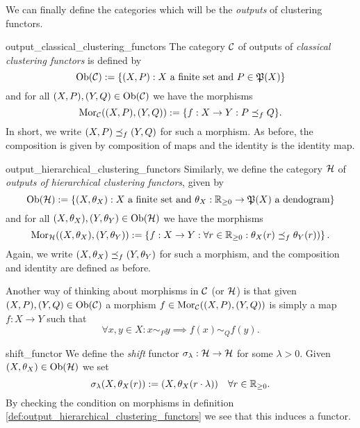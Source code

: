 We can finally define the categories which will be the \emph{outputs} of clustering functors.

\begin{definition}{\cite[Def.~3.2]{Carlsson2010}}{output_classical_clustering_functors}
The category $\mathcal{C}$ of outputs of \emph{classical clustering functors} is defined by
\begin{equation*}
    \mathrm {Ob}(\mathcal{C}) := \{(X, P): X \text{ a finite set and } P \in \mathfrak{P}(X)\}
\end{equation*}
and for all $(X,P), (Y,Q) \in \mathrm {Ob}(\mathcal{C})$ we have the morphisms
\begin{equation*}
    \mathrm {Mor}_{\mathcal{C}}((X,P), (Y,Q)) := \{f: X \to Y: P \preceq_f Q\}.
\end{equation*}
In short, we write $(X,P) \preceq_f (Y,Q)$ for such a morphism. As before, the composition is given by composition of maps and the identity is the identity map.
\end{definition}

\begin{definition}{\cite[Def.~3.3]{Carlsson2010}}{output_hierarchical_clustering_functors}
Similarly, we define the category $\mathcal{H}$ of \emph{outputs of hierarchical clustering functors}, given by
\begin{equation*}
    \mathrm {Ob}(\mathcal{H}) := \{(X, \theta_X): X \text{ a finite set and } \theta_X: \mathbb R_{\geq0} \to \mathfrak{P}(X) \ \text{a dendogram}\}
\end{equation*}
and for all $(X, \theta_X), (Y, \theta_Y) \in \mathrm {Ob}(\mathcal{H})$ we have the morphisms
\begin{equation*}
    \mathrm {Mor}_{\mathcal{H}}((X, \theta_X), (Y,\theta_Y)) :=
    \left\{f: X \to Y: \forall r \in \mathbb R_{\geq0}: \theta_X(r) \preceq_f \theta_Y(r)) \right\}.
\end{equation*}
Again, we write $(X, \theta_X) \preceq_f (Y, \theta_Y)$ for such a morphism, and the composition and identity are defined as before.
\end{definition}

Another way of thinking about morphisms in $\mathcal{C}$ (or $\mathcal{H}$) is that given $(X,P), (Y,Q) \in \mathrm {Ob}(\mathcal{C})$ a morphism $f \in \mathrm {Mor}_{\mathcal{C}}((X,P), (Y,Q))$ is simply a map $f: X \to Y$ such that
$$
\forall x,y \in X: x \sim_P y \implies f(x) \sim_Q f(y).
$$

\begin{definition}{}{shift_functor}
We define the \emph{shift} functor $\sigma_\lambda: \mathcal{H} \to \mathcal{H}$ for some $\lambda > 0$. Given $(X, \theta_X) \in \mathrm {Ob}(\mathcal{H})$ we set
$$
\sigma_\lambda(X, \theta_X(r)) := (X, \theta_X(r \cdot \lambda)) \quad \forall r \in \mathbb R_{\geq0}.
$$
By checking the condition on morphisms in definition \ref{def:output_hierarchical_clustering_functors} we see that this induces a functor.

\end{definition}

